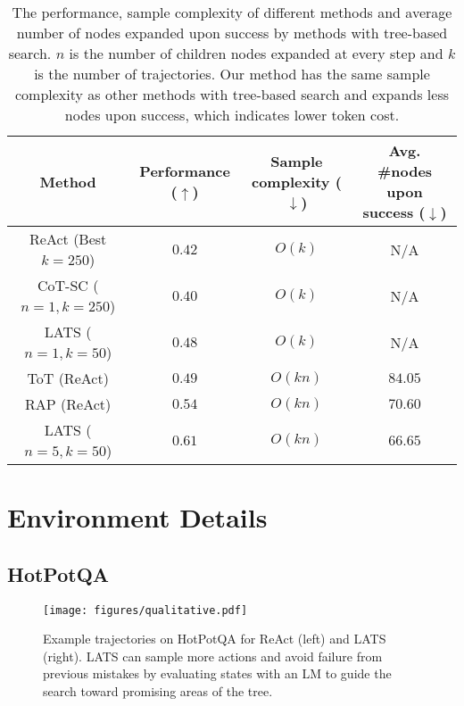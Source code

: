 \documentclass{article} \usepackage{iclr2024_conference,times}
\begin{document}
{\begin{table}[h]
    
    \small
    \centering
    \begin{tabular}{c|c|c|c}
        Method & Performance ($\uparrow$) & Sample complexity ($\downarrow$) & Avg. \#nodes upon success ($\downarrow$) \\
        \hline
         ReAct (Best $k=250$) & $0.42$ & $O(k)$ & N/A  \\
         CoT-SC ($n=1, k=250$) & $0.40$ & $O(k)$ & N/A  \\
         LATS ($n=1, k=50$) & $0.48$ & $O(k)$ & N/A  \\
         ToT (ReAct) & $0.49$ & $O(kn)$ & $84.05$  \\
         RAP (ReAct) & $0.54$ & $O(kn)$ & $70.60$  \\
         LATS ($n=5,k=50$) & $0.61$ & $O(kn)$ & $66.65$\\
    \end{tabular}
    \caption{ The performance, sample complexity of different methods and average number of nodes expanded upon success by methods with tree-based search. $n$ is the number of children nodes expanded at every step and $k$ is the number of trajectories. Our method has the same sample complexity as other methods with tree-based search and expands less nodes upon success, which indicates lower token cost.}
    \label{tab:cost}
\end{table}
}

\section{Environment Details}
\label{sec:envdetail}
\subsection{HotPotQA}

\begin{figure}[t]
    \centering
    \texttt{[image: figures/qualitative.pdf]}
    \caption{{Example trajectories on} HotPotQA for ReAct (left) and LATS (right). LATS can sample more actions and avoid failure from previous mistakes by evaluating states with an LM to guide the search toward promising areas of the tree.}
    \label{fig:qualitative}
    \vspace{-0.1in}
\end{figure}
\end{document}
